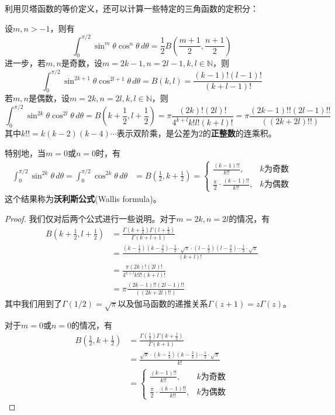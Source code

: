 利用贝塔函数的等价定义，还可以计算一些特定的三角函数的定积分：
\begin{proposition}
    设$m,n>-1$，则有
    \[\int_{0}^{\pi/2}\sin^m\theta\cos^n\theta\,d\theta=\frac{1}{2}B\left(\frac{m+1}{2},\frac{n+1}{2}\right)\]
    进一步，若$m,n$是奇数，设$m=2k-1,n=2l-1,k,l\in\mathbb{N}$，则
    \[\int_{0}^{\pi/2}\sin^{2k+1}\theta\cos^{2l+1}\theta\,d\theta=B(k,l)=\frac{(k-1)!(l-1)!}{(k+l-1)!}\]
    若$m,n$是偶数，设$m=2k,n=2l,k,l\in\mathbb{N}$，则
    \[\int_{0}^{\pi/2}\sin^{2k}\theta\cos^{2l}\theta\,d\theta=B\left(k+\frac{1}{2},l+\frac{1}{2}\right)=\pi\frac{(2k)!(2l)!}{4^{k+l}k!l!(k+l)!}=\pi\frac{(2k-1)!!(2l-1)!!}{((2k+2l)!!)}\]
    其中$k!!=k(k-2)(k-4)\cdots$表示双阶乘，是公差为2的\textbf{正整数}的连乘积。

    特别地，当$m=0$或$n=0$时，有
    \begin{align*}
        \int_{0}^{\pi/2}\sin^{2k}\theta\,d\theta=\int_{0}^{\pi/2}\cos^{2k}\theta\,d\theta&=B\left(\frac{1}{2},k+\frac{1}{2}\right)=\begin{cases}
            \frac{(k-1)!!}{k!!}, & k\text{为奇数} \\
            \frac{\pi}{2}\cdot\frac{(k-1)!!}{k!!}, & k\text{为偶数}
        \end{cases}
    \end{align*}
    这个结果称为\textbf{沃利斯公式}(Wallis formula)。
\end{proposition}
\begin{proof}
    我们仅对后两个公式进行一些说明。对于$m=2k,n=2l$的情况，有
    \begin{align*}
        B\left(k+\frac{1}{2},l+\frac{1}{2}\right)&=\frac{\Gamma \left(k+\frac{1}{2}\right)\Gamma \left(l+\frac{1}{2}\right)}{\Gamma \left(k+l+1\right)}\\
        &=\frac{\left(k-\frac{1}{2}\right)\left(k-\frac{3}{2}\right)\cdots\frac{1}{2}\cdot\sqrt{\pi}\cdot\left(l-\frac{1}{2}\right)\left(l-\frac{3}{2}\right)\cdots\frac{1}{2}\cdot\sqrt{\pi}}{(k+l)!}\\
        &=\frac{\pi(2k)!(2l)!}{4^{k+l}k!l!(k+l)!}\\
        &=\pi\frac{(2k-1)!!(2l-1)!!}{((2k+2l)!!)}
    \end{align*}
    其中我们用到了$\Gamma(1/2)=\sqrt{\pi}$以及伽马函数的递推关系$\Gamma(z+1)=z\Gamma(z)$。
    
    对于$m=0$或$n=0$的情况，有
    \begin{align*}
        B\left(\frac{1}{2},k+\frac{1}{2}\right)&=\frac{\Gamma \left(\frac{1}{2}\right)\Gamma \left(k+\frac{1}{2}\right)}{\Gamma \left(k+1\right)}\\
                                             &=\frac{\sqrt{\pi}\cdot\left(k-\frac{1}{2}\right)\left(k-\frac{3}{2}\right)\cdots\frac{1}{2}\cdot\sqrt{\pi}}{k!}\\
                                             &=\begin{cases}
            \frac{(k-1)!!}{k!!}, & k\text{为奇数} \\
            \frac{\pi}{2}\cdot\frac{(k-1)!!}{k!!}, & k\text{为偶数}
        \end{cases}
    \end{align*}
\end{proof}

